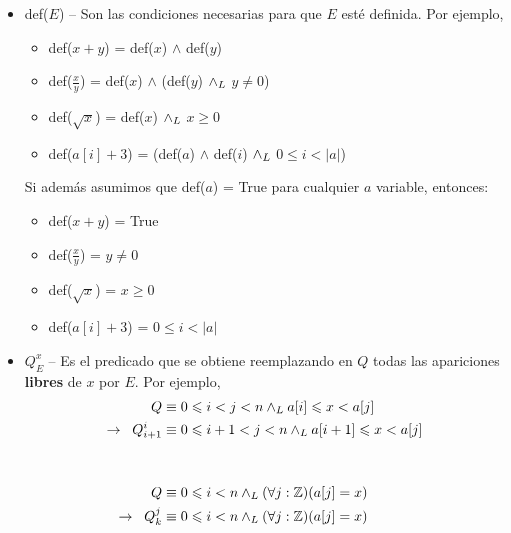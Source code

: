 \documentclass[../main.tex]{subfiles}
\begin{document}
\begin{itemize}
    \item def($E$) -- Son las condiciones necesarias para que $E$ esté definida. Por ejemplo,
    \begin{itemize}[label=$\cdot$]
        \item def($x+y$) = def($x$) $\land$ def($y$)
        \item def($\frac{x}{y}$) = def($x$) $\land$ (def($y$) $\land _L$ $y \neq 0$)
        \item def($\sqrt{x}$) = def($x$) $\land _L$ $x \geq 0$
        \item def($a[i]+3$) = (def($a$) $\land$ def($i$) $\land _L$ $0 \leq i < |a|$)
    \end{itemize}
    Si además asumimos que def($a$) = True para cualquier $a$ variable, entonces:
    \begin{itemize}[label=$\cdot$]
        \item def($x+y$) = True
        \item def($\frac{x}{y}$) = $y \neq 0$
        \item def($\sqrt{x}$) = $x \geq 0$
        \item def($a[i]+3$) = $0 \leq i < |a|$
    \end{itemize} \nln

    \item $Q_{E}^x$ -- Es el predicado que se obtiene reemplazando en $Q$ todas las apariciones \textbf{libres} de $x$ por $E$. Por ejemplo,  
    \setcounter{saveeqn}{\value{equation}} %
    \setcounter{equation}{0} %
    \renewcommand{\theequation}{\Alph{equation}} %
    \begin{align}
        Q &\equiv 0 \leq i < j < n \yLuego a[i] \leq x < a[j]                   \nonumber \\
        \rightarrow\;\; Q_{i+1}^i &\equiv 0 \leq i+1 < j < n \yLuego a[i+1] \leq x < a[j] \\
        \nonumber \\
        \nonumber \\
        Q &\equiv 0 \leq i < n \yLuego (\forall j : \Z)(a[j] = x)               \nonumber \\
        \rightarrow\;\; Q_{k}^{j} &\equiv 0 \leq i < n \yLuego (\forall j : \Z)(a[j] = x) %
        \label{qex_bound_variable}
    \end{align}
    \setcounter{equation}{\value{saveeqn}}
    \renewcommand{\theequation}{\alph{equation}} %
\end{itemize}
\end{document}
